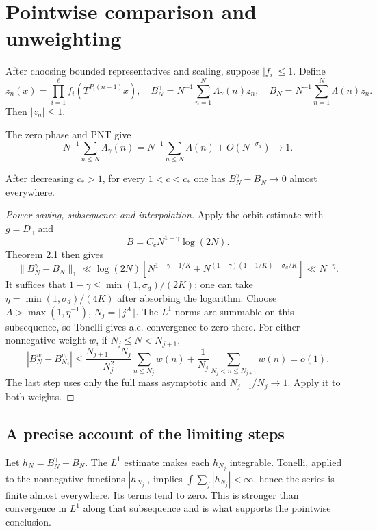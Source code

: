 \section{Pointwise comparison and unweighting}
\begin{definition}\label{def:averages}
After choosing bounded representatives and scaling, suppose $|f_i|\leq1$. Define
\[
 z_n(x)=\prod_{i=1}^{\ell}f_i(T^{P_i(n-1)}x),\quad
 B_N^\gamma=N^{-1}\sum_{n=1}^N\Lambda_\gamma(n)z_n,\quad
 B_N=N^{-1}\sum_{n=1}^N\Lambda(n)z_n.
\]
Then $|z_n|\leq1$.
\end{definition}
The zero phase and PNT give
\[
 N^{-1}\sum_{n\leq N}\Lambda_\gamma(n)
 =N^{-1}\sum_{n\leq N}\Lambda(n)+O(N^{-\sigma_d})\longrightarrow1.
\]

\begin{proposition}\label{p:pointwise-comparison}
\leanok
After decreasing $c_*>1$, for every $1<c<c_*$ one has
$B_N^\gamma-B_N\to0$ almost everywhere.
\end{proposition}
\begin{proof}[Power saving, subsequence and interpolation]
\leanok
Apply the orbit estimate with $g=D_\gamma$ and
\[B=C_cN^{1-\gamma}\log(2N).\]
Theorem 2.1 then gives
\[
 \|B_N^\gamma-B_N\|_1\ll\log(2N)
 \left[N^{1-\gamma-1/K}
 +N^{(1-\gamma)(1-1/K)-\sigma_d/K}\right]\ll N^{-\eta}.
\]
It suffices that $1-\gamma\leq\min(1,\sigma_d)/(2K)$; one can take $\eta=\min(1,\sigma_d)/(4K)$ after absorbing the logarithm. Choose $A>\max(1,\eta^{-1})$, $N_j=\lfloor j^A\rfloor$. The $L^1$ norms are summable on this subsequence, so Tonelli gives a.e. convergence to zero there. For either nonnegative weight $w$, if $N_j\leq N<N_{j+1}$,
\[
 |B_N^w-B_{N_j}^w|
 \leq\frac{N_{j+1}-N_j}{N_j^2}\sum_{n\leq N_j}w(n)
 +\frac1{N_j}\sum_{N_j<n\leq N_{j+1}}w(n)=o(1).
\]
The last step uses only the full mass asymptotic and $N_{j+1}/N_j\to1$. Apply it to both weights.
\end{proof}
\ifDetailed
\subsection*{A precise account of the limiting steps}
Let $h_N=B_N^\gamma-B_N$. The $L^1$ estimate makes each $h_{N_j}$ integrable. Tonelli, applied to the nonnegative functions $|h_{N_j}|$, implies $\int\sum_j|h_{N_j}|<\infty$, hence the series is finite almost everywhere. Its terms tend to zero. This is stronger than convergence in $L^1$ along that subsequence and is what supports the pointwise conclusion.

